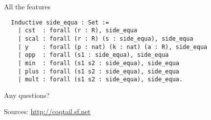 \documentclass{beamer}
\begin{document}
\begin{frame}[fragile]{All the features}
\begin{verbatim}
  Inductive side_equa : Set :=
    | cst  : forall (r : R), side_equa
    | scal : forall (r : R) (s : side_equa), side_equa
    | y    : forall (p : nat) (k : nat) (a : R), side_equa
    | opp  : forall (s1 : side_equa), side_equa
    | min  : forall (s1 s2 : side_equa), side_equa
    | plus : forall (s1 s2 : side_equa), side_equa
    | mult : forall (s1 s2 : side_equa), side_equa.
\end{verbatim}
\end{frame}

\begin{frame}{Any questions?}

Sources: \url{http://coqtail.sf.net}

\end{frame}
\end{document}
